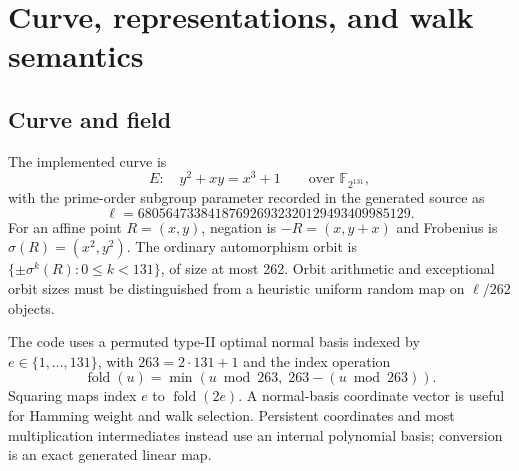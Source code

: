 \documentclass[11pt,a4paper]{article}
\newcommand{\F}{\mathbb{F}}
\begin{document}
\section{Curve, representations, and walk semantics}
\subsection{Curve and field}
The implemented curve is
\begin{equation}
 E:\quad y^2+xy=x^3+1\qquad\text{over }\F_{2^{131}},
\end{equation}
with the prime-order subgroup parameter recorded in the generated source as
\begin{equation}
 \ell=680564733841876926932320129493409985129.
\end{equation}
For an affine point $R=(x,y)$, negation is $-R=(x,y+x)$ and Frobenius is $\sigma(R)=(x^2,y^2)$. The ordinary automorphism orbit is $\{\pm\sigma^k(R):0\leq k<131\}$, of size at most 262. Orbit arithmetic and exceptional orbit sizes must be distinguished from a heuristic uniform random map on $\ell/262$ objects.

The code uses a permuted type-II optimal normal basis indexed by $e\in\{1,\ldots,131\}$, with $263=2\cdot131+1$ and the index operation
\begin{equation}
 \operatorname{fold}(u)=\min(u\bmod263,\;263-(u\bmod263)).
\end{equation}
Squaring maps index $e$ to $\operatorname{fold}(2e)$. A normal-basis coordinate vector is useful for Hamming weight and walk selection. Persistent coordinates and most multiplication intermediates instead use an internal polynomial basis; conversion is an exact generated linear map.
\end{document}
